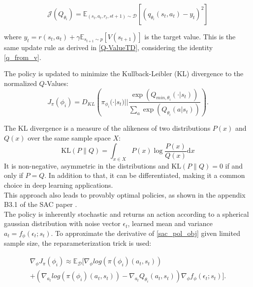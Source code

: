 \begin{equation}
    \mathcal{J}(Q_{\theta_i}) = \mathbb{E}_{(s_t, a_t, r_t, s{t+1}) \sim \mathcal{D}}[(q_{\theta_i}(s_t,a_t) - y_t)^2]
\end{equation}

where $y_t = r(s_t, a_t) + \gamma \mathbb{E}_{s_{t+1} \sim p}[V(s_{t+1})]$ is the target value. This is the same update rule as derived in \ref{Q-ValueTD}, 
considering the identity \ref{q_from_v}.

The policy is updated to minimize the Kullback-Leibler (KL) divergence to the normalized $Q$-Values:
\begin{equation}
    \label{sac_pol_obj}
    J_\pi(\phi_{i}) = D_{KL} \left( \pi_{\phi_{i}}(\cdot|s_t) || \frac{\exp(Q_{min, {\theta_i}}(\cdot|s_t))}{\underset{a}{\sum}  \exp(Q_{\theta_i}(a|s_t))} \right).
\end{equation}

The KL divergence is a measure of the alikeness of two distributions $P(x)$ and $Q(x)$ over the same sample space $X$:
\begin{equation}
    \label{KL}
    \mathrm{KL}(P\|Q) = \int_{x\in X} P(x) \log \frac{P(x)}{Q(x)} \mathrm{d}x
\end{equation}
It is non-negative, asymmetric in the distributions and $\mathrm{KL}(P\|Q) = 0$ if and only if $P = Q$. In addition to that, it can be differentiated, making it 
a common choice in deep learning applications.\\

This approach also leads to provably optimal policies, as shown in the appendix B3.1 of the SAC paper \cite{haarnoja2018soft}. \\
The policy is inherently stochastic and returns an action according to a spherical gaussian distribution with noise vector $\epsilon_t$, learned mean and variance $a_t = f_{\phi}(\epsilon_t;s_t)$. 
To approximate the derivative of \ref{sac_pol_obj} given limited sample size, the reparameterization trick is used:

\begin{equation}
    \label{SAC_update_rule}
    \begin{align}
        \nabla_{\phi}J_\pi(\phi_{i}) \approx \mathbb{E}_{\mathcal{D}} [\nabla_{\phi} log (\pi(\phi_{i})(a_t, s_t))\\
        + \left( \nabla_{a_t} log (\pi(\phi_{i})(a_t, s_t)) - \nabla_{a_t} Q_{\theta_i}(a_t, s_t) \right) \nabla_{\phi} f_{\phi}(\epsilon_t;s_t)].
    \end{align}
\end{equation}



